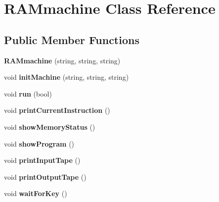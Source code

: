\hypertarget{classRAMmachine}{\section{R\-A\-Mmachine Class Reference}
\label{classRAMmachine}
}
\subsection*{Public Member Functions}
\begin{DoxyCompactItemize}
\item 
\hypertarget{classRAMmachine_ad5ec54172e71b87c76f8a4b4d31e06bd}{{\bfseries R\-A\-Mmachine} (string, string, string)}\label{classRAMmachine_ad5ec54172e71b87c76f8a4b4d31e06bd}

\item 
\hypertarget{classRAMmachine_a42b4e5cc1c054c28011e00ab54c98bbf}{void {\bfseries init\-Machine} (string, string, string)}\label{classRAMmachine_a42b4e5cc1c054c28011e00ab54c98bbf}

\item 
\hypertarget{classRAMmachine_a4e5efa9b417958cd42f649f66e237710}{void {\bfseries run} (bool)}\label{classRAMmachine_a4e5efa9b417958cd42f649f66e237710}

\item 
\hypertarget{classRAMmachine_ade5769f9ae186bed299fa164d16ebc33}{void {\bfseries print\-Current\-Instruction} ()}\label{classRAMmachine_ade5769f9ae186bed299fa164d16ebc33}

\item 
\hypertarget{classRAMmachine_a94145ee5533985c15c38156069a7b67e}{void {\bfseries show\-Memory\-Status} ()}\label{classRAMmachine_a94145ee5533985c15c38156069a7b67e}

\item 
\hypertarget{classRAMmachine_a9d0a4de83f7bb48565f7abb370215ac0}{void {\bfseries show\-Program} ()}\label{classRAMmachine_a9d0a4de83f7bb48565f7abb370215ac0}

\item 
\hypertarget{classRAMmachine_ada124c82636c272ef71f82e5dec53a41}{void {\bfseries print\-Input\-Tape} ()}\label{classRAMmachine_ada124c82636c272ef71f82e5dec53a41}

\item 
\hypertarget{classRAMmachine_ac8fe4966b254a0663685d5d42521814c}{void {\bfseries print\-Output\-Tape} ()}\label{classRAMmachine_ac8fe4966b254a0663685d5d42521814c}

\item 
\hypertarget{classRAMmachine_a5b1d7da020547c622f787e3d831ddda8}{void {\bfseries wait\-For\-Key} ()}\label{classRAMmachine_a5b1d7da020547c622f787e3d831ddda8}


\end{DoxyCompactItemize}
